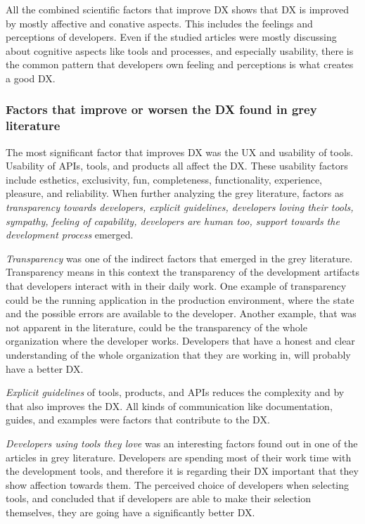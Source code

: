 \documentclass[english, 12pt, a4paper, sci, utf8, a-1b, online]{aaltothesis}
\begin{document}
All the combined scientific factors that improve DX shows that DX is improved by mostly affective and conative aspects. This includes the feelings and perceptions of developers. Even if the studied articles were mostly discussing about cognitive aspects like tools and processes, and especially usability, there is the common pattern that developers own feeling and perceptions is what creates a good DX.

\subsubsection{Factors that improve or worsen the DX found in grey literature}

The most significant factor that improves DX was the UX and usability of tools. Usability of APIs, tools, and products all affect the DX. These usability factors include esthetics, exclusivity, fun, completeness, functionality, experience, pleasure, and reliability. When further analyzing the grey literature, factors as \textit{transparency towards developers, explicit guidelines, developers loving their tools, sympathy, feeling of capability, developers are human too, support towards the development process} emerged.

\textit{Transparency} was one of the indirect factors that emerged in the grey literature. Transparency means in this context the transparency of the development artifacts that developers interact with in their daily work. One example of transparency could be the running application in the production environment, where the state and the possible errors are available to the developer. Another example, that was not apparent in the literature, could be the transparency of the whole organization where the developer works. Developers that have a honest and clear understanding of the whole organization that they are working in, will probably have a better DX.

\textit{Explicit guidelines} of tools, products, and APIs reduces the complexity and by that also improves the DX. All kinds of communication like documentation, guides, and examples were factors that contribute to the DX.

\textit{Developers using tools they love} was an interesting factors found out in one of the articles in grey literature. Developers are spending most of their work time with the development tools, and therefore it is regarding their DX important that they show affection towards them. The perceived choice of developers when selecting tools, and concluded that if developers are able to make their selection themselves, they are going have a significantly better DX.
\end{document}

